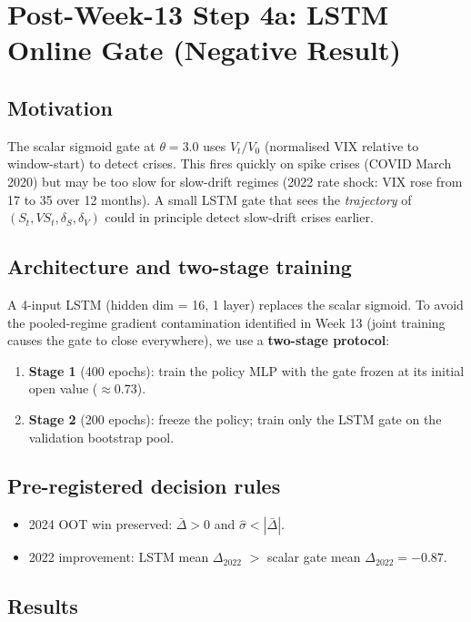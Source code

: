\documentclass[11pt, a4paper]{article}
\begin{document}
\section{Post-Week-13 Step 4a: LSTM Online Gate (Negative Result)}
\label{sec:step4a}

\subsection{Motivation}

The scalar sigmoid gate at $\theta = 3.0$ uses $V_t / V_0$ (normalised
VIX relative to window-start) to detect crises. This fires quickly on
spike crises (COVID March 2020) but may be too slow for slow-drift
regimes (2022 rate shock: VIX rose from 17 to 35 over 12 months). A
small LSTM gate that sees the \emph{trajectory} of $(S_t, VS_t, \delta_S,
\delta_V)$ could in principle detect slow-drift crises earlier.

\subsection{Architecture and two-stage training}

A 4-input LSTM (hidden dim = 16, 1 layer) replaces the scalar sigmoid.
To avoid the pooled-regime gradient contamination identified in Week 13
(joint training causes the gate to close everywhere), we use a
\textbf{two-stage protocol}:
\begin{enumerate}
  \item \textbf{Stage 1} (400 epochs): train the policy MLP with the gate
        frozen at its initial open value ($\approx 0.73$).
  \item \textbf{Stage 2} (200 epochs): freeze the policy; train only the
        LSTM gate on the validation bootstrap pool.
\end{enumerate}

\subsection{Pre-registered decision rules}
\begin{itemize}
  \item 2024 OOT win preserved: $\bar{\Delta} > 0$ and
        $\hat{\sigma} < |\bar{\Delta}|$.
  \item 2022 improvement: LSTM mean $\Delta_{2022}$ $>$ scalar gate
        mean $\Delta_{2022} = -0.87$.
\end{itemize}

\subsection{Results}
\end{document}
